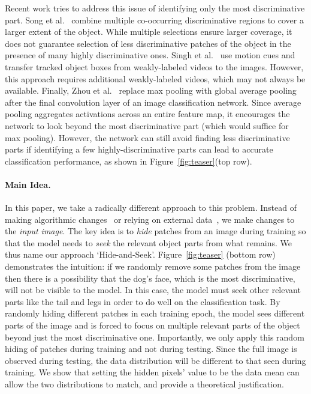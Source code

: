 \documentclass[10pt,twocolumn,letterpaper]{article}
\begin{document}
Recent work tries to address this issue of identifying only the most discriminative part.  Song et al.~\cite{song-nips2014} combine multiple co-occurring discriminative regions to cover a larger extent of the object.  While multiple selections ensure larger coverage, it does not guarantee selection of less discriminative patches of the object in the presence of many highly discriminative ones.  Singh et al.~\cite{krishna-cvpr2016} use motion cues and transfer tracked object boxes from weakly-labeled videos to the images.  However, this approach requires additional weakly-labeled videos, which may not always be available.  Finally, Zhou et al.~\cite{zhou-cvpr2016} replace max pooling with global average pooling after the final convolution layer of an image classification network.  Since average pooling aggregates activations across an entire feature map, it encourages the network to look beyond the most discriminative part (which would suffice for max pooling).  However, the network can still avoid finding less discriminative parts if identifying a few highly-discriminative parts can lead to accurate classification performance, as shown in Figure~\ref{fig:teaser}(top row).

\vspace{-10pt}\paragraph{Main Idea.} In this paper, we take a radically different approach to this problem.  Instead of making algorithmic changes~\cite{song-nips2014,zhou-cvpr2016} or relying on external data~\cite{krishna-cvpr2016}, we make changes to the \emph{input image}.  The key idea is to \emph{hide} patches from an image during training so that the model needs to \emph{seek} the relevant object parts from what remains.  We thus name our approach `Hide-and-Seek'.  Figure~\ref{fig:teaser} (bottom row) demonstrates the intuition: if we randomly remove some patches from the image then there is a possibility that the dog's face, which is the most discriminative, will not be visible to the model. In this case, the model must seek other relevant parts like the tail and legs in order to do well on the classification task.  By randomly hiding different patches in each training epoch, the model sees different parts of the image and is forced to focus on multiple relevant parts of the object beyond just the most discriminative one.   Importantly, we only apply this random hiding of patches during training and not during testing.  Since the full image is observed during testing, the data distribution will be different to that seen during training.  We show that setting the hidden pixels' value to be the data mean can allow the two distributions to match, and provide a theoretical justification.
\end{document}
